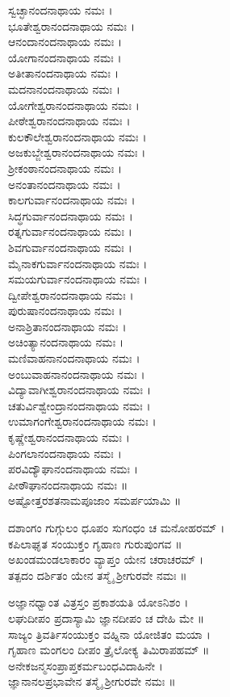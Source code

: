 ಸ್ವಚ್ಛಾನಂದನಾಥಾಯ ನಮಃ ।\\
ಭೂತೇಶ್ವರಾನಂದನಾಥಾಯ ನಮಃ ।\\
ಆನಂದಾನಂದನಾಥಾಯ ನಮಃ ।\\
ಯೋಗಾನಂದನಾಥಾಯ ನಮಃ ।\\
ಅತೀತಾನಂದನಾಥಾಯ ನಮಃ ।\\
ಮದನಾನಂದನಾಥಾಯ ನಮಃ ।\\
ಯೋಗೇಶ್ವರಾನಂದನಾಥಾಯ ನಮಃ ।\\
ಪೀಠೇಶ್ವರಾನಂದನಾಥಾಯ ನಮಃ ।\\
ಕುಲಕೌಲೇಶ್ವರಾನಂದನಾಥಾಯ ನಮಃ ।\\
ಅಜಕುಬ್ಜೇಶ್ವರಾನಂದನಾಥಾಯ ನಮಃ ।\\
ಶ್ರೀಕಂಠಾನಂದನಾಥಾಯ ನಮಃ ।\\
ಅನಂತಾನಂದನಾಥಾಯ ನಮಃ ।\\
ಕಾಲಗುರ್ವಾನಂದನಾಥಾಯ ನಮಃ ।\\
ಸಿದ್ಧಗುರ್ವಾನಂದನಾಥಾಯ ನಮಃ ।\\
ರತ್ನಗುರ್ವಾನಂದನಾಥಾಯ ನಮಃ ।\\
ಶಿವಗುರ್ವಾನಂದನಾಥಾಯ ನಮಃ ।\\
ಮೈನಾಕಗುರ್ವಾನಂದನಾಥಾಯ ನಮಃ ।\\
ಸಮಯಗುರ್ವಾನಂದನಾಥಾಯ ನಮಃ ।\\
ದ್ವೀಪೇಶ್ವರಾನಂದನಾಥಾಯ ನಮಃ ।\\
ಪುರುಷಾನಂದನಾಥಾಯ ನಮಃ ।\\
ಅನಾಶ್ರಿತಾನಂದನಾಥಾಯ ನಮಃ ।\\
ಅಚಿಂತ್ಯಾನಂದನಾಥಾಯ ನಮಃ ।\\
ಮಣಿವಾಹನಾನಂದನಾಥಾಯ ನಮಃ ।\\
ಅಂಬುವಾಹನಾನಂದನಾಥಾಯ ನಮಃ ।\\
ವಿದ್ಯಾವಾಗೀಶ್ವರಾನಂದನಾಥಾಯ ನಮಃ ।\\
ಚತುರ್ವಿಶ್ವೇಂದ್ರಾನಂದನಾಥಾಯ ನಮಃ ।\\
ಉಮಾಗಂಗೇಶ್ವರಾನಂದನಾಥಾಯ ನಮಃ ।\\
ಕೃಷ್ಣೇಶ್ವರಾನಂದನಾಥಾಯ ನಮಃ ।\\
ಪಿಂಗಲಾನಂದನಾಥಾಯ ನಮಃ ।\\
ಪರವಿದ್ಯೌಘಾನಂದನಾಥಾಯ ನಮಃ ।\\
ಪೀಠೌಘಾನಂದನಾಥಾಯ ನಮಃ ॥\\
ಅಷ್ಟೋತ್ತರಶತನಾಮಪೂಜಾಂ ಸಮರ್ಪಯಾಮಿ ॥

ದಶಾಂಗಂ ಗುಗ್ಗುಲಂ ಧೂಪಂ ಸುಗಂಧಂ ಚ ಮನೋಹರಮ್ ।\\
ಕಪಿಲಾಘೃತ ಸಂಯುಕ್ತಂ ಗೃಹಾಣ ಗುರುಪುಂಗವ ॥\\
ಅಖಂಡಮಂಡಲಾಕಾರಂ ವ್ಯಾಪ್ತಂ ಯೇನ ಚರಾಚರಮ್ ।\\
ತತ್ಪದಂ ದರ್ಶಿತಂ ಯೇನ ತಸ್ಮೈ ಶ್ರೀಗುರವೇ ನಮಃ ॥

ಅಜ್ಞಾನಧ್ವಾಂತ ವಿತ್ರಸ್ತಂ ಪ್ರಕಾಶಯತಿ ಯೋಽನಿಶಂ ।\\
ಲಘುದೀಪಂ ಪ್ರದಾಸ್ಯಾಮಿ ಜ್ಞಾನದೀಪಂ ಚ ದೇಹಿ ಮೇ ॥\\
ಸಾಜ್ಯಂ ತ್ರಿವರ್ತಿಸಂಯುಕ್ತಂ ವಹ್ನಿನಾ ಯೋಜಿತಂ ಮಯಾ ।\\
ಗೃಹಾಣ ಮಂಗಲಂ ದೀಪಂ ತ್ರೈಲೋಕ್ಯ ತಿಮಿರಾಪಹಮ್ ॥\\
ಅನೇಕಜನ್ಮಸಂಪ್ರಾಪ್ತಕರ್ಮಬಂಧವಿದಾಹಿನೇ ।\\
ಜ್ಞಾನಾನಲಪ್ರಭಾವೇನ ತಸ್ಮೈ ಶ್ರೀಗುರವೇ ನಮಃ ॥

